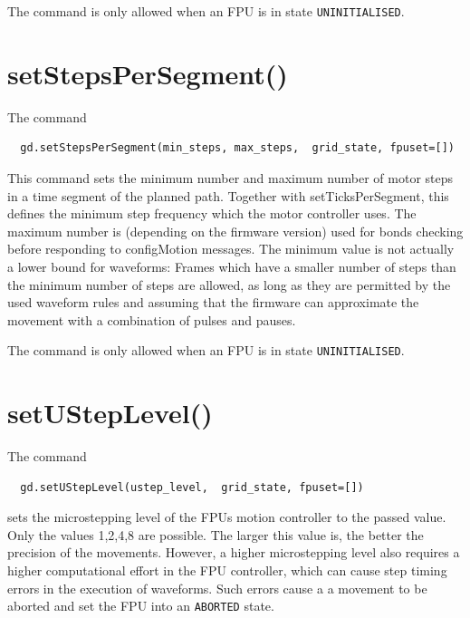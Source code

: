 \documentclass[fontsize=12,a4paper]{scrreprt}
\begin{document}
The command is only allowed when an FPU is in state \texttt{UNINITIALISED}.


\section{setStepsPerSegment()}
\label{sec:setStepsPerSegment}

The command
\begin{verbatim}
  gd.setStepsPerSegment(min_steps, max_steps,  grid_state, fpuset=[])
\end{verbatim}
This command sets the minimum number and maximum number of motor steps
in a time segment of the planned path. Together with
setTicksPerSegment, this defines the minimum step frequency which the
motor controller uses. The maximum number is (depending on the
firmware version) used for bonds checking before responding to
configMotion messages. The minimum value is not actually a lower
bound for waveforms: Frames which have a smaller number of steps than
the minimum number of steps are allowed, as long as they are permitted
by the used waveform rules and assuming that the firmware can
approximate the movement with a combination of pulses and pauses.

The command is only allowed when an FPU is in state \texttt{UNINITIALISED}.

\section{setUStepLevel()}
\label{sec:setTickPerSegment}

The command
\begin{verbatim}
  gd.setUStepLevel(ustep_level,  grid_state, fpuset=[])
\end{verbatim}
sets the microstepping level of the FPUs motion controller to the
passed value. Only the values 1,2,4,8 are possible.  The larger this
value is, the better the precision of the movements.  However, a
higher microstepping level also requires a higher computational effort
in the FPU controller, which can cause step timing errors in the
execution of waveforms. Such errors cause a a movement to be aborted
and set the FPU into an \texttt{ABORTED} state.
\end{document}
